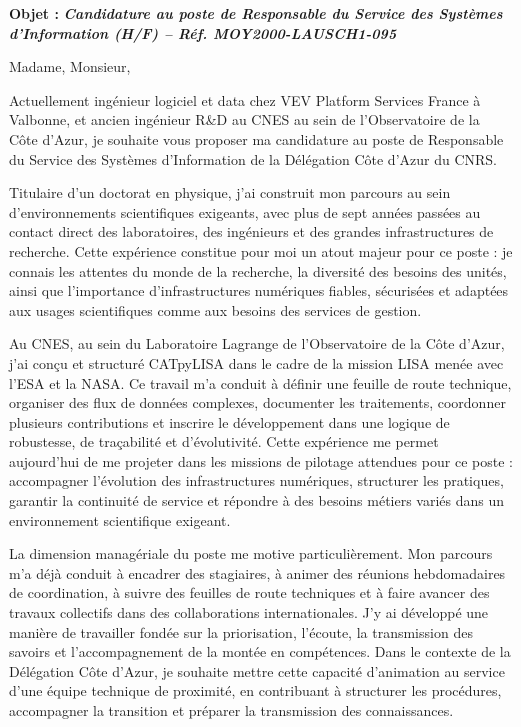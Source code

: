 \documentclass[11pt,a4paper]{altacv}
\begin{document}
\makecvheader

\iffalse
{\color{accent}\textbf{Objet :}} \textit{\textbf{Candidature au poste de Responsable du Service des Systèmes d'Information (H/F) -- Réf. MOY2000-LAUSCH1-095}}

\vspace{0.3cm}

{\color{body}

Madame, Monsieur,

Actuellement ingénieur logiciel et data chez VEV Platform Services France à Valbonne, et ancien ingénieur R\&D au CNES au sein de l'Observatoire de la Côte d'Azur, je souhaite vous proposer ma candidature au poste de Responsable du Service des Systèmes d'Information de la Délégation Côte d'Azur du CNRS.

Titulaire d’un doctorat en physique, j’ai construit mon parcours au sein d’environnements scientifiques exigeants, avec plus de sept années passées au contact direct des laboratoires, des ingénieurs et des grandes infrastructures de recherche. Cette expérience constitue pour moi un atout majeur pour ce poste : je connais les attentes du monde de la recherche, la diversité des besoins des unités, ainsi que l’importance d’infrastructures numériques fiables, sécurisées et adaptées aux usages scientifiques comme aux besoins des services de gestion.

Au CNES, au sein du Laboratoire Lagrange de l’Observatoire de la Côte d’Azur, j’ai conçu et structuré CATpyLISA dans le cadre de la mission LISA menée avec l’ESA et la NASA. Ce travail m’a conduit à définir une feuille de route technique, organiser des flux de données complexes, documenter les traitements, coordonner plusieurs contributions et inscrire le développement dans une logique de robustesse, de traçabilité et d’évolutivité. Cette expérience me permet aujourd’hui de me projeter dans les missions de pilotage attendues pour ce poste : accompagner l’évolution des infrastructures numériques, structurer les pratiques, garantir la continuité de service et répondre à des besoins métiers variés dans un environnement scientifique exigeant.

La dimension managériale du poste me motive particulièrement. Mon parcours m’a déjà conduit à encadrer des stagiaires, à animer des réunions hebdomadaires de coordination, à suivre des feuilles de route techniques et à faire avancer des travaux collectifs dans des collaborations internationales. J’y ai développé une manière de travailler fondée sur la priorisation, l’écoute, la transmission des savoirs et l’accompagnement de la montée en compétences. Dans le contexte de la Délégation Côte d’Azur, je souhaite mettre cette capacité d’animation au service d’une équipe technique de proximité, en contribuant à structurer les procédures, accompagner la transition et préparer la transmission des connaissances.

}
\end{document}
